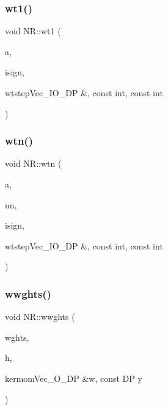 \mbox{\label{namespaceNR_adf8819d18e13fefed2454ef15c091a5d}} 
\subsubsection{\texorpdfstring{wt1()}{wt1()}}
{\footnotesize\ttfamily void N\+R\+::wt1 (\begin{DoxyParamCaption}\item[{\mbox{\hyperlink{namespaceNR_ab293e06a6bf799d8a7ed932b6852bcb8}{Vec\+\_\+\+I\+O\+\_\+\+DP}} \&}]{a,  }\item[{const int}]{isign,  }\item[{void }]{wtstepVec\+\_\+\+I\+O\+\_\+\+D\+P \&, const int, const int }\end{DoxyParamCaption})}

\mbox{\label{namespaceNR_a2eeb46a9d50e58e09b864b3b8f21ab5b}} 
\subsubsection{\texorpdfstring{wtn()}{wtn()}}
{\footnotesize\ttfamily void N\+R\+::wtn (\begin{DoxyParamCaption}\item[{\mbox{\hyperlink{namespaceNR_ab293e06a6bf799d8a7ed932b6852bcb8}{Vec\+\_\+\+I\+O\+\_\+\+DP}} \&}]{a,  }\item[{\mbox{\hyperlink{namespaceNR_ae67ce7dc86a8a64a7ce73c3c030ff610}{Vec\+\_\+\+I\+\_\+\+I\+NT}} \&}]{nn,  }\item[{const int}]{isign,  }\item[{void }]{wtstepVec\+\_\+\+I\+O\+\_\+\+D\+P \&, const int, const int }\end{DoxyParamCaption})}

\mbox{\label{namespaceNR_a58e63db23848e90d1a5db7af79dda323}} 
\subsubsection{\texorpdfstring{wwghts()}{wwghts()}}
{\footnotesize\ttfamily void N\+R\+::wwghts (\begin{DoxyParamCaption}\item[{\mbox{\hyperlink{namespaceNR_a970094d23441f8ef6a45282a7eb2103d}{Vec\+\_\+\+O\+\_\+\+DP}} \&}]{wghts,  }\item[{const \mbox{\hyperlink{namespaceNR_af6ff762dd605ff477b8e52387253a02a}{DP}}}]{h,  }\item[{void }]{kermomVec\+\_\+\+O\+\_\+\+D\+P \&w, const D\+P y }\end{DoxyParamCaption})}

